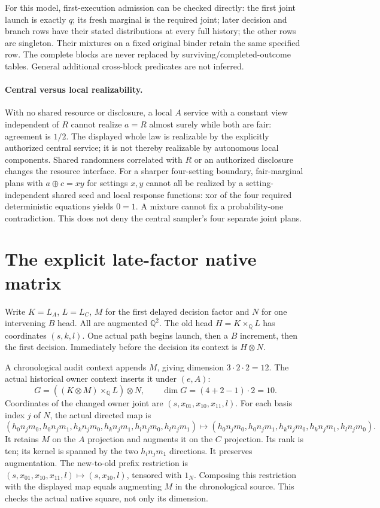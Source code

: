 \documentclass[11pt]{article}
\begin{document}
For this model, first-execution admission can be checked directly: the first joint launch is exactly $q$; its fresh marginal is the required joint; later decision and branch rows have their stated distributions at every full history; the other rows are singleton. Their mixtures on a fixed original binder retain the same specified row. The complete blocks are never replaced by surviving/completed-outcome tables. General additional cross-block predicates are not inferred.

\paragraph{Central versus local realizability.}
With no shared resource or disclosure, a local $A$ service with a constant view independent of $R$ cannot realize $a=R$ almost surely while both are fair: agreement is $1/2$. The displayed whole law is realizable by the explicitly authorized central service; it is not thereby realizable by autonomous local components. Shared randomness correlated with $R$ or an authorized disclosure changes the resource interface. For a sharper four-setting boundary, fair-marginal plans with $a\oplus c=xy$ for settings $x,y$ cannot all be realized by a setting-independent shared seed and local response functions: xor of the four required deterministic equations yields $0=1$. A mixture cannot fix a probability-one contradiction. This does not deny the central sampler's four separate joint plans.

\section{The explicit late-factor native matrix}
Write $K=L_A$, $L=L_C$, $M$ for the first delayed decision factor and $N$ for one intervening $B$ head. All are augmented $\mathbb Q^2$. The old head $H=K\times_{\mathbb Q}L$ has coordinates $(s,k,l)$. One actual path begins launch, then a $B$ increment, then the first decision. Immediately before the decision its context is $H\otimes N$.

A chronological audit context appends $M$, giving dimension $3\cdot2\cdot2=12$. The actual historical owner context inserts it under $(e,A)$:
\[
 G=((K\otimes M)\times_{\mathbb Q}L)\otimes N,
 \qquad\dim G=(4+2-1)\cdot2=10.
\]
Coordinates of the changed owner joint are $(s,x_{01},x_{10},x_{11},l)$. For each basis index $j$ of $N$, the actual directed map is
\[
 (h_0n_jm_0,h_0n_jm_1,h_kn_jm_0,h_kn_jm_1,h_ln_jm_0,h_ln_jm_1)
 \mapsto(h_0n_jm_0,h_0n_jm_1,h_kn_jm_0,h_kn_jm_1,h_ln_jm_0).
\]
It retains $M$ on the $A$ projection and augments it on the $C$ projection. Its rank is ten; its kernel is spanned by the two $h_l n_jm_1$ directions. It preserves augmentation. The new-to-old prefix restriction is $(s,x_{01},x_{10},x_{11},l)\mapsto(s,x_{10},l)$, tensored with $1_N$. Composing this restriction with the displayed map equals augmenting $M$ in the chronological source. This checks the actual native square, not only its dimension.
\end{document}
